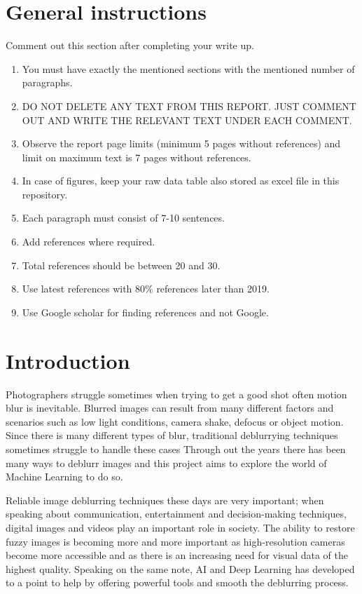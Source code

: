 \documentclass[conference]{IEEEtran}
\begin{document}
\section{General instructions}
Comment out this section after completing your write up.
\begin{enumerate}
\item You must have exactly the mentioned sections with the mentioned number of paragraphs.
\item DO NOT DELETE ANY TEXT FROM THIS REPORT. JUST COMMENT OUT AND WRITE THE RELEVANT TEXT UNDER EACH COMMENT.
\item Observe the report page limits (minimum 5 pages without references) and limit on maximum text is 7 pages without references. 
\item In case of figures, keep your raw data table also stored as excel file in this repository.
\item Each paragraph must consist of 7-10 sentences.
\item Add references where required.
\item Total references should be between 20 and 30.
\item Use latest references with 80\% references later than 2019.
\item Use Google scholar for finding references and not Google.
\end{enumerate}

\section{Introduction}
Photographers struggle sometimes when trying to get a good shot often motion blur is inevitable. 
Blurred images can result from many different factors and scenarios such as low light conditions, camera shake, defocus or object motion.
Since there is many different types of blur, traditional deblurrying techniques sometimes struggle to handle these cases
Through out the years there has been many ways to deblurr images and this project aims to explore the world of Machine Learning to do so.

Reliable image deblurring techniques these days are very important; when speaking about communication, entertainment and decision-making techniques, digital images and videos play an important role in society. 
The ability to restore fuzzy images is becoming more and more important as high-resolution cameras become more accessible and as there is an increasing need for visual data of the highest quality. 
Speaking on the same note, AI and Deep Learning has developed to a point to help by offering powerful tools and smooth the deblurring process.
\end{document}

